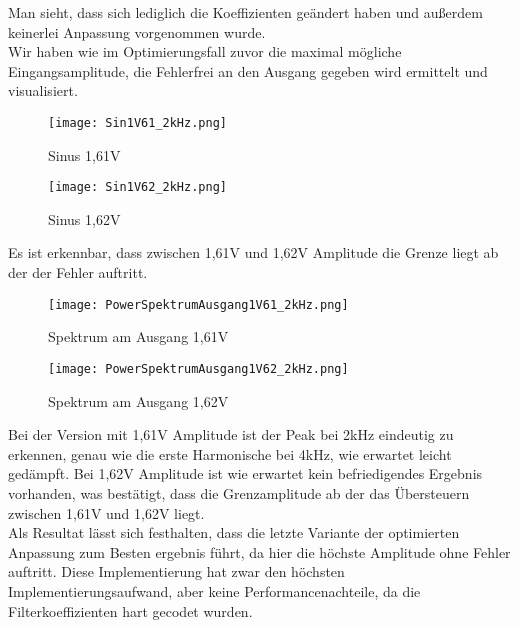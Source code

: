 Man sieht, dass sich lediglich die Koeffizienten geändert haben und außerdem keinerlei Anpassung vorgenommen wurde.\\
Wir haben wie im Optimierungsfall zuvor die maximal mögliche Eingangsamplitude, die Fehlerfrei an den Ausgang gegeben wird ermittelt und visualisiert.
\begin{figure}[H]
  \centering
    \texttt{[image: Sin1V61\_2kHz.png]}
  \caption{Sinus 1,61V}
  \label{fig:Sin1V61_2kHz}
\end{figure}
\begin{figure}[H]
  \centering
    \texttt{[image: Sin1V62\_2kHz.png]}
  \caption{Sinus 1,62V}
  \label{fig:Sin1V62_2kHz}
\end{figure}
Es ist erkennbar, dass zwischen 1,61V und 1,62V Amplitude die Grenze liegt ab der der Fehler auftritt.
\begin{figure}[H]
  \centering
    \texttt{[image: PowerSpektrumAusgang1V61\_2kHz.png]}
  \caption{Spektrum am Ausgang 1,61V}
  \label{fig:PowerSpektrumAusgang1V61_2kHz}
\end{figure}
\begin{figure}[H]
  \centering
    \texttt{[image: PowerSpektrumAusgang1V62\_2kHz.png]}
  \caption{Spektrum am Ausgang 1,62V}
  \label{fig:PowerSpektrumAusgang1V62_2kHz}
\end{figure}
Bei der Version mit 1,61V Amplitude ist der Peak bei 2kHz eindeutig zu erkennen, genau wie die erste Harmonische bei 4kHz, wie erwartet leicht gedämpft. Bei 1,62V Amplitude ist wie erwartet kein befriedigendes Ergebnis vorhanden, was bestätigt, dass die Grenzamplitude ab der das Übersteuern zwischen 1,61V und 1,62V liegt.\\ 
Als Resultat lässt sich festhalten, dass die letzte Variante der optimierten Anpassung zum Besten ergebnis führt, da hier die höchste Amplitude ohne Fehler auftritt. Diese Implementierung hat zwar den höchsten Implementierungsaufwand, aber keine Performancenachteile, da die Filterkoeffizienten hart gecodet wurden.